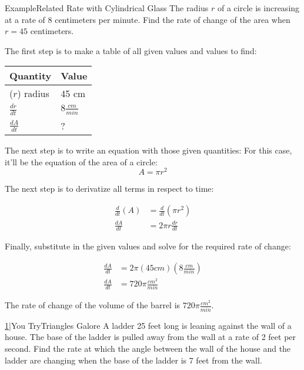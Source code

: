 \documentclass{MathNotes}
\newenvironment{example}[1]{\begin{BlueBox}{Example}{#1}}{\end{BlueBox}}
\newenvironment{practice}[2]{\begin{PurpleBox}{\texorpdfstring{#1}\Big|You Try}{#2}}{\end{PurpleBox}}
\begin{document}
\begin{example}{Related Rate with Cylindrical Glass}
	The radius $r$ of a circle is increasing at a rate of 8 centimeters per
	minute. Find the rate of change of the area when $r = 45$ centimeters.

	The first step is to make a table of all given values and values to find:
	\begin{center}
		\begin{tabular}{l|l}
			Quantity        & Value             \\
			\hline
			($r$) radius    & 45 cm             \\
			$\frac{dr}{dt}$ & $8\frac{cm}{min}$ \\
			$\frac{dA}{dt}$ & ?                 \\
		\end{tabular}
	\end{center}

	The next step is to write an equation with those given quantities: For this
	case, it'll be the equation of the area of a circle: $$A=\pi r^2$$

	The next step is to derivatize all terms in respect to time:

	\begin{align*}
		\frac{d}{dt}(A) & =\frac{d}{dt}(\pi r^2) \\
		\frac{dA}{dt}   & =2\pi r\frac{dr}{dt}
	\end{align*}

	Finally, substitute in the given values and solve for the required rate
	of change:

	\begin{align*}
		\frac{dA}{dt} & =2\pi (45cm)(8\frac{cm}{min}) \\
		\frac{dA}{dt} & =720\pi\frac{cm^2}{min}
	\end{align*}

	The rate of change of the volume of the barrel is $720\pi\frac{cm^2}{min}$.
\end{example}

\begin{practice}{\hyperref[ans:2.5-1]{1}}{Triangles Galore}
	\label{prac:2.5-1}
	A ladder 25 feet long is leaning against the wall of a house. The base
	of the ladder is pulled away from the wall at a rate of 2 feet per
	second. Find the rate at which the angle between the wall of the house and the
	ladder are changing when the base of the ladder is 7 feet from the wall.
\end{practice}
\end{document}
